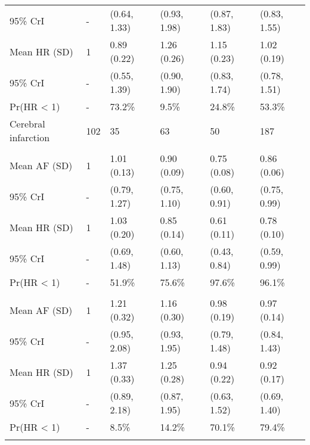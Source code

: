\documentclass[nutrients,article,accept,moreauthors,pdftex]{Definitions/mdpi}
\begin{document}
\begin{table}[H]
{\begin{tabular}{L{32mm}C{8mm}C{26mm}C{25mm}C{25mm}C{20mm}}
   \hspace{1em}95\% CrI & - & (0.64, 1.33) & (0.93, 1.98) & (0.87, 1.83) & (0.83, 1.55)\\
\hspace{1em}Mean HR (SD) & 1 & 0.89 (0.22) & 1.26 (0.26) & 1.15 (0.23) & 1.02 (0.19)\\
   \hspace{1em}95\% CrI & - & (0.55, 1.39) & (0.90, 1.90) & (0.83, 1.74) & (0.78, 1.51)\\
\hspace{1em}Pr(HR < 1) & - & 73.2\% & 9.5\% & 24.8\% & 53.3\%\\
\hline
   Cerebral infarction & 102 & 35 & 63 & 50 & 187\\
\addlinespace[0.3em]
\\
\hspace{1em}Mean AF (SD) & 1 & 1.01 (0.13) & 0.90 (0.09) & 0.75 (0.08) & 0.86 (0.06)\\
   \hspace{1em}95\% CrI & - & (0.79, 1.27) & (0.75, 1.10) & (0.60, 0.91) & (0.75, 0.99)\\
\hspace{1em}Mean HR (SD) & 1 & 1.03 (0.20) & 0.85 (0.14) & 0.61 (0.11) & 0.78 (0.10)\\
   \hspace{1em}95\% CrI & - & (0.69, 1.48) & (0.60, 1.13) & (0.43, 0.84) & (0.59, 0.99)\\
\hspace{1em}Pr(HR < 1) & - & 51.9\% & 75.6\% & 97.6\% & 96.1\%\\
\addlinespace[0.3em]
\\
   \hspace{1em}Mean AF (SD) & 1 & 1.21 (0.32) & 1.16 (0.30) & 0.98 (0.19) & 0.97 (0.14)\\
\hspace{1em}95\% CrI & - & (0.95, 2.08) & (0.93, 1.95) & (0.79, 1.48) & (0.84, 1.43)\\
   \hspace{1em}Mean HR (SD) & 1 & 1.37 (0.33) & 1.25 (0.28) & 0.94 (0.22) & 0.92 (0.17)\\
\hspace{1em}95\% CrI & - & (0.89, 2.18) & (0.87, 1.95) & (0.63, 1.52) & (0.69, 1.40)\\
   \hspace{1em}Pr(HR < 1) & - & 8.5\% & 14.2\% & 70.1\% & 79.4\%\\
\addlinespace[0.3em]

\end{tabular}}
\end{table}
\end{document}
